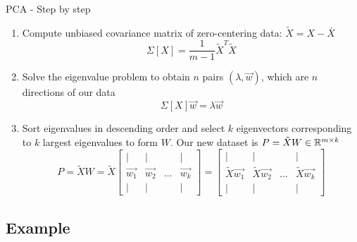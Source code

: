 \begin{frame}{PCA - Step by step}
    \begin{enumerate}
        \item Compute unbiased covariance matrix of zero-centering data: $\tilde{X} = X - \bar{X}$ %
        $$\Sigma[X] = \frac{1}{m-1}\tilde{X}^T\tilde{X}$$

        \item Solve the eigenvalue problem to obtain $n$ pairs $(\lambda, \vec{w})$, which are $n$ directions of our data
        $$\Sigma[X]\vec{w} = \lambda \vec{w}$$

        \item Sort eigenvalues in descending order and select $k$ eigenvectors corresponding to $k$ largest eigenvalues to form $W$. \alert{Our new dataset is $P = \tilde{X}W \in \mathbb{R}^{m\times k}$}
        $$P = \tilde{X}W = \tilde{X} \begin{bmatrix}
            \vert     &\vert     & & \vert     \\
            \vec{w_1} &\vec{w_2} & \dots & \vec{w_k} \\
            \vert     &\vert     & & \vert     
        \end{bmatrix} = \begin{bmatrix}
            \vert     &\vert     & & \vert     \\
            \tilde{X}\vec{w_1} &\tilde{X}\vec{w_2} & \dots & \tilde{X}\vec{w_k} \\
            \vert     &\vert     & & \vert     
        \end{bmatrix}$$
    \end{enumerate}
\end{frame}

\subsection{Example}

